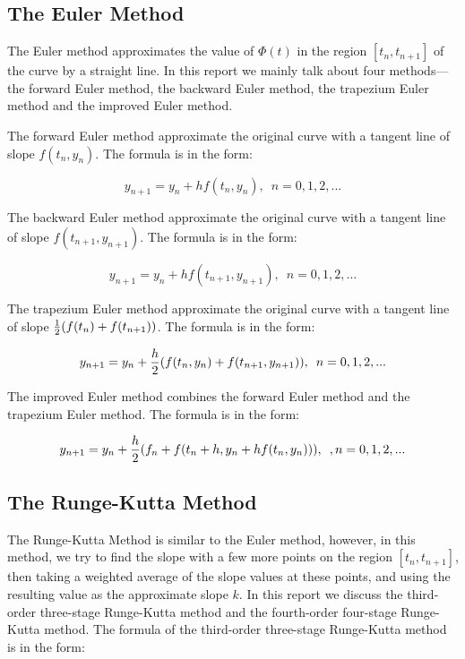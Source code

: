 \documentclass[a4paper]{article}
\begin{document}
    \subsection{The Euler Method}
	
	The Euler method approximates the value of $\Phi(t)$ in the region $[t_n, t_{n+1}]$ of the curve by a straight line. In this report we mainly talk about four methods—the forward Euler method, the backward Euler method, the trapezium Euler method and the improved Euler method.
	
	The forward Euler method approximate the original curve with a tangent line of slope $f(t_n, y_n)$. The formula is in the form:
	
	\begin{equation}\label{eq.1}
		y_{n+1} = y_n + hf(t_n, y_n), \enspace n = 0,1,2,...
	\end{equation}
	
	The backward Euler method approximate the original curve with a tangent line of slope $f(t_{n+1}, y_{n+1})$. The formula is in the form:
	
	\begin{equation}\label{eq.2}
		y_{n+1} = y_n + hf(t_{n+1}, y_{n+1}), \enspace n = 0,1,2,...
	\end{equation}	
	
	The trapezium Euler method approximate the original curve with a tangent line of slope ${1 \over 2}(f(t_n)+f(t_{n+1}))$. The formula is in the form:
	
		\begin{equation}\label{eq.1}
		y_{n+1} = y_n + {h\over2}(f(t_n, y_n)+f(t_{n+1}, y_{n+1})), \enspace n = 0,1,2,...
	\end{equation}
	
	The improved Euler method combines the forward Euler method and the trapezium Euler method. The formula is in the form:
	
	\begin{equation}\label{eq.3}
		y_{n+1} = y_n + {h \over 2}(f_n + f(t_n + h, y_n + hf(t_n, y_n))), \enspace, n = 0,1,2,...
	\end{equation}	
	
	
	\subsection{The Runge-Kutta Method}
	
	The Runge-Kutta Method is similar to the Euler method, however, in this method, we try to find the slope with a few more points on the region $[t_n, t_{n+1}]$, then taking a weighted average of the slope values at these points, and using the resulting value as the approximate slope $k$.
	In this report we discuss the third-order three-stage Runge-Kutta method and the fourth-order four-stage Runge-Kutta method. The formula of the third-order three-stage Runge-Kutta method is in the form:
	
\end{document}
